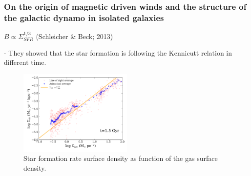\documentclass[10pt,aspectratio=169]{beamer}
\begin{document}
\begin{frame}
	\frametitle{On the origin of magnetic driven winds and the structure of the galactic dynamo in isolated galaxies \citep{2020MNRAS.494.4393S}}
	$B\propto \Sigma_{SFR}^{1/3}$ (Schleicher $\&$ Beck; 2013)
	
	- They showed that the star formation is following the Kennicutt relation in different time.
	
	\begin{figure}
		\includegraphics[width=0.5\textwidth]{./images/sk_mag_075_new.pdf}
		\caption{Star formation rate surface density as function of the gas surface density.}
	\end{figure}
\end{frame}
\end{document}
